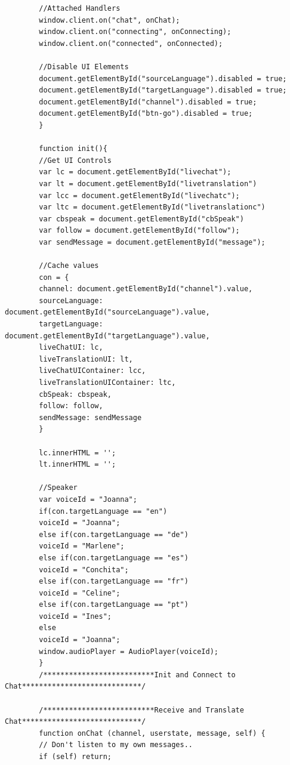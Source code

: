 \documentclass[english,runningheads,a4paper]{llncs}[2018/03/10]
\begin{document}
\begin{verbatim}
        //Attached Handlers
        window.client.on("chat", onChat);
        window.client.on("connecting", onConnecting);
        window.client.on("connected", onConnected);
        
        //Disable UI Elements
        document.getElementById("sourceLanguage").disabled = true;
        document.getElementById("targetLanguage").disabled = true;
        document.getElementById("channel").disabled = true;
        document.getElementById("btn-go").disabled = true;
        }
        
        function init(){
        //Get UI Controls
        var lc = document.getElementById("livechat");
        var lt = document.getElementById("livetranslation")
        var lcc = document.getElementById("livechatc");
        var ltc = document.getElementById("livetranslationc")
        var cbspeak = document.getElementById("cbSpeak")
        var follow = document.getElementById("follow");
        var sendMessage = document.getElementById("message");
        
        //Cache values
        con = {
        channel: document.getElementById("channel").value,
        sourceLanguage: document.getElementById("sourceLanguage").value,
        targetLanguage: document.getElementById("targetLanguage").value,
        liveChatUI: lc,
        liveTranslationUI: lt,
        liveChatUIContainer: lcc,
        liveTranslationUIContainer: ltc,
        cbSpeak: cbspeak,
        follow: follow,
        sendMessage: sendMessage
        }
        
        lc.innerHTML = '';
        lt.innerHTML = '';
        
        //Speaker
        var voiceId = "Joanna";
        if(con.targetLanguage == "en")
        voiceId = "Joanna";
        else if(con.targetLanguage == "de")
        voiceId = "Marlene";
        else if(con.targetLanguage == "es")
        voiceId = "Conchita";
        else if(con.targetLanguage == "fr")
        voiceId = "Celine";
        else if(con.targetLanguage == "pt")
        voiceId = "Ines";
        else
        voiceId = "Joanna";
        window.audioPlayer = AudioPlayer(voiceId);
        }
        /**************************Init and Connect to Chat****************************/
        
        /**************************Receive and Translate Chat****************************/
        function onChat (channel, userstate, message, self) {
        // Don't listen to my own messages..
        if (self) return;
        

\end{verbatim}
\end{document}
